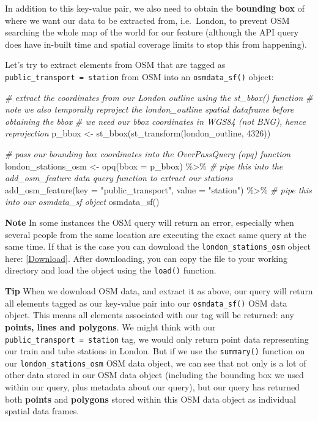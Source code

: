\documentclass[
]{book}
\newenvironment{Shaded}{\begin{snugshade}}{\end{snugshade}}
\newcommand{\AttributeTok}[1]{\textcolor[rgb]{0.77,0.63,0.00}{#1}}
\newcommand{\CommentTok}[1]{\textcolor[rgb]{0.56,0.35,0.01}{\textit{#1}}}
\newcommand{\DecValTok}[1]{\textcolor[rgb]{0.00,0.00,0.81}{#1}}
\newcommand{\FunctionTok}[1]{\textcolor[rgb]{0.00,0.00,0.00}{#1}}
\newcommand{\NormalTok}[1]{#1}
\newcommand{\OtherTok}[1]{\textcolor[rgb]{0.56,0.35,0.01}{#1}}
\newcommand{\SpecialCharTok}[1]{\textcolor[rgb]{0.00,0.00,0.00}{#1}}
\newcommand{\StringTok}[1]{\textcolor[rgb]{0.31,0.60,0.02}{#1}}
\begin{document}
In addition to this key-value pair, we also need to obtain the \textbf{bounding box} of where we want our data to be extracted from, i.e.~London, to prevent OSM searching the whole map of the world for our feature (although the API query does have in-built time and spatial coverage limits to stop this from happening).

Let's try to extract elements from OSM that are tagged as \texttt{public\_transport\ =\ station} from OSM into an \texttt{osmdata\_sf()} object:

\begin{Shaded}
\begin{Highlighting}[]
\CommentTok{\# extract the coordinates from our London outline using the st\_bbox() function}
\CommentTok{\# note we also temporally reproject the london\_outline spatial dataframe before obtaining the bbox}
\CommentTok{\# we need our bbox coordinates in WGS84 (not BNG), hence reprojection}
\NormalTok{p\_bbox }\OtherTok{\textless{}{-}} \FunctionTok{st\_bbox}\NormalTok{(}\FunctionTok{st\_transform}\NormalTok{(london\_outline, }\DecValTok{4326}\NormalTok{))}

\CommentTok{\# pass our bounding box coordinates into the OverPassQuery (opq) function}
\NormalTok{london\_stations\_osm }\OtherTok{\textless{}{-}} \FunctionTok{opq}\NormalTok{(}\AttributeTok{bbox =}\NormalTok{ p\_bbox) }\SpecialCharTok{\%\textgreater{}\%}
  \CommentTok{\# pipe this into the add\_osm\_feature data query function to extract our stations}
  \FunctionTok{add\_osm\_feature}\NormalTok{(}\AttributeTok{key =} \StringTok{"public\_transport"}\NormalTok{, }\AttributeTok{value =} \StringTok{"station"}\NormalTok{) }\SpecialCharTok{\%\textgreater{}\%}
  \CommentTok{\# pipe this into our osmdata\_sf object}
  \FunctionTok{osmdata\_sf}\NormalTok{()}
\end{Highlighting}
\end{Shaded}

\textbf{Note}
In some instances the OSM query will return an error, especially when several people from the same location are executing the exact same query at the same time. If that is the case you can download the \texttt{london\_stations\_osm} object here: \href{https://github.com/jtvandijk/GEOG0030/tree/master/data/zip/london_stations_osm.RData}{{[}Download{]}}. After downloading, you can copy the file to your working directory and load the object using the \texttt{load()} function.

\textbf{Tip}
When we download OSM data, and extract it as above, our query will return all elements tagged as our key-value pair into our \texttt{osmdata\_sf()} OSM data object. This means all elements associated with our tag will be returned: any \textbf{points, lines and polygons}. We might think with our \texttt{public\_transport\ =\ station} tag, we would only return point data representing our train and tube stations in London. But if we use the \texttt{summary()} function on our \texttt{london\_stations\_osm} OSM data object, we can see that not only is a lot of other data stored in our OSM data object (including the bounding box we used within our query, plus metadata about our query), but our query has returned both \textbf{points} and \textbf{polygons} stored within this OSM data object as individual spatial data frames.
\end{document}
